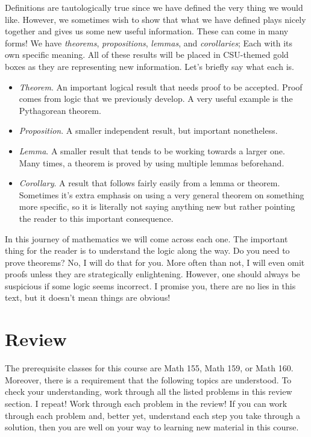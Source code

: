     Definitions are tautologically true since we have defined the very thing we would like.  However, we sometimes wish to show that what we have defined plays nicely together and gives us some new useful information.  These can come in many forms!  We have \emph{theorems}, \emph{propositions}, \emph{lemmas}, and \emph{corollaries}; Each with its own specific meaning.  All of these results will be placed in CSU-themed gold boxes as they are representing new information. Let's briefly say what each is.
    
    \begin{itemize}
        \item \emph{Theorem}. An important logical result that needs proof to be accepted.  Proof comes from logic that we previously develop.  A very useful example is the Pythagorean theorem. 
        \item \emph{Proposition}. A smaller independent result, but important nonetheless.
        \item \emph{Lemma}. A smaller result that tends to be working towards a larger one.  Many times, a theorem is proved by using multiple lemmas beforehand.  
        \item \emph{Corollary}. A result that follows fairly easily from a lemma or theorem.  Sometimes it's extra emphasis on using a very general theorem on something more specific, so it is literally not saying anything new but rather pointing the reader to this important consequence.
    \end{itemize}
    
    In this journey of mathematics we will come across each one.  The important thing for the reader is to understand the logic along the way.  Do you need to prove theorems? No, I will do that for you. More often than not, I will even omit proofs unless they are strategically enlightening.  However, one should always be suspicious if some logic seems incorrect. I promise you, there are no lies in this text, but it doesn't mean things are obvious!
    
    
    \section{Review}
    The prerequisite classes for this course are Math 155, Math 159, or Math 160.  Moreover, there is a requirement that the following topics are understood.  To check your understanding, work through all the listed problems in this review section. I repeat! Work through each problem in the review! If you can work through each problem and, better yet, understand each step you take through a solution, then you are well on your way to learning new material in this course.
    

